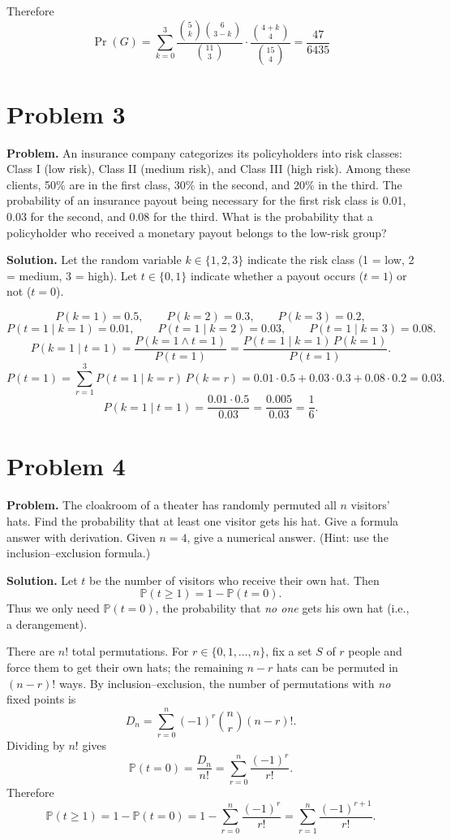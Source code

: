 \documentclass{article}
\begin{document}
Therefore
\[
\Pr(G)=\sum_{k=0}^{3}\frac{\binom{5}{k}\binom{6}{3-k}}{\binom{11}{3}}
\cdot \frac{\binom{4+k}{4}}{\binom{15}{4}}
= \frac{47}{6435}
\]

\section{Problem 3}

\textbf{Problem.} An insurance company categorizes its policyholders into risk classes: Class I (low risk), Class II (medium risk), and Class III (high risk). Among these clients, 50\% are in the first class, 30\% in the second, and 20\% in the third. The probability of an insurance payout being necessary for the first risk class is 0.01, 0.03 for the second, and 0.08 for the third. What is the probability that a policyholder who received a monetary payout belongs to the low-risk group?

\textbf{Solution.}
Let the random variable $k\in\{1,2,3\}$ indicate the risk class (1 = low, 2 = medium, 3 = high).
Let $t\in\{0,1\}$ indicate whether a payout occurs ($t=1$) or not ($t=0$).

\[
P(k=1)=0.5,\qquad P(k=2)=0.3,\qquad P(k=3)=0.2,
\]
\[
P(t=1\mid k=1)=0.01,\qquad P(t=1\mid k=2)=0.03,\qquad P(t=1\mid k=3)=0.08.
\]
\[
P(k=1\mid t=1)=\frac{P(k=1\wedge t=1)}{P(t=1)}
=\frac{P(t=1\mid k=1)\,P(k=1)}{P(t=1)}.
\]
\[
P(t=1)=\sum_{r=1}^{3} P(t=1\mid k=r)\,P(k=r)
=0.01\cdot0.5+0.03\cdot0.3+0.08\cdot0.2
=0.03.
\]
\[
P(k=1\mid t=1)
=\frac{0.01\cdot 0.5}{0.03}
=\frac{0.005}{0.03}
=\frac{1}{6}.
\]

\section{Problem 4}

\textbf{Problem.} The cloakroom of a theater has randomly permuted all \( n \) visitors’ hats. Find the probability that at least one visitor gets his hat. Give a formula answer with derivation. Given \( n = 4 \), give a numerical answer. (Hint: use the inclusion–exclusion formula.)

\textbf{Solution.}
Let $t$ be the number of visitors who receive their own hat. Then
\[
\mathbb{P}(t\ge 1)=1-\mathbb{P}(t=0).
\]
Thus we only need $\mathbb{P}(t=0)$, the probability that \emph{no one} gets his own hat
(i.e., a derangement).

There are $n!$ total permutations. For $r\in\{0,1,\dots,n\}$, fix a set $S$ of $r$
people and force them to get their own hats; the remaining $n-r$ hats can be
permuted in $(n-r)!$ ways. By inclusion–exclusion, the number of permutations
with \emph{no} fixed points is
\[
D_n
= \sum_{r=0}^n (-1)^r \binom{n}{r} (n-r)!.
\]
Dividing by $n!$ gives
\[
\mathbb{P}(t=0)=\frac{D_n}{n!}
=\sum_{r=0}^n \frac{(-1)^r}{r!}.
\]
Therefore
\[
\mathbb{P}(t\ge 1)=1-\mathbb{P}(t=0)
=1-\sum_{r=0}^n \frac{(-1)^r}{r!}
=\sum_{r=1}^n \frac{(-1)^{r+1}}{r!}.
\]
\end{document}
